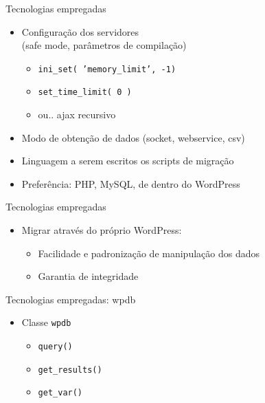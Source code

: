 \documentclass{beamer}
\begin{document}
\begin{frame}{Tecnologias empregadas}
  \begin{itemize}
    \pause \item Configuração dos servidores\pause \\
                 (safe mode, parâmetros de compilação)
    \begin{itemize}
      \pause \item \texttt{ini\_set( 'memory\_limit', -1)}
      \pause \item \texttt{set\_time\_limit( 0 )}
      \pause \item ou.. \pause ajax recursivo
    \end{itemize}
    \pause \item Modo de obtenção de dados (socket, webservice, csv)
    \pause \item Linguagem a serem escritos os scripts de migração
    \pause \item Preferência: \pause PHP\pause, MySQL\pause, de dentro
                 do WordPress
  \end{itemize}
\end{frame}

\begin{frame}{Tecnologias empregadas}
  \begin{itemize}
    \pause \item Migrar através do próprio WordPress:
    \begin{itemize}
      \pause \item Facilidade e padronização de manipulação dos dados
      \pause \item Garantia de integridade
    \end{itemize}
  \end{itemize}
\end{frame}

\begin{frame}{Tecnologias empregadas: wpdb}
  \begin{itemize}
    \pause \item Classe \texttt{wpdb}
    \begin{itemize}
      \pause \item \texttt{query()}
      \pause \item \texttt{get\_results()}
      \pause \item \texttt{get\_var()}
    \end{itemize}
  \end{itemize}
\end{frame}
\end{document}
